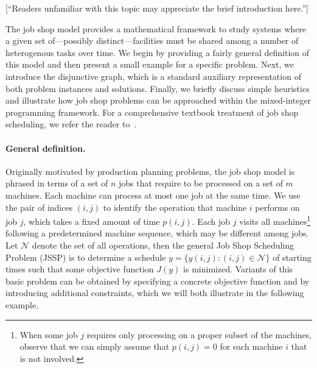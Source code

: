 \documentclass[a4paper]{report}
\theoremstyle{definition}
\theoremstyle{plain}
\newcommand\note[1]{{\color{Navy}#1}}
\begin{document}
\note{[``Readers unfamiliar with this topic may appreciate the brief introduction here.'']}

The job shop model provides a mathematical framework to study systems where a
given set of---possibly distinct---facilities must be shared among a number of
heterogenous tasks over time.
%
We begin by providing a fairly general definition of this model and then present a
small example for a specific problem.
%
Next, we introduce the disjunctive graph, which is a standard auxiliary
representation of both problem instances and solutions.
%
Finally, we briefly discuss simple heuristics and illustrate how job shop
problems can be approached within the mixed-integer programming framework.
%
For a comprehensive textbook treatment of job shop scheduling, we refer the
reader to~\cite[Chapter 7]{pinedoSchedulingTheoryAlgorithms2016}.

\paragraph{General definition.}
Originally motivated by production planning problems, the job shop model is
phrased in terms of a set of $n$ jobs that require to be processed on a set of
$m$ machines. Each machine can process at most one job at the same time.
%
We use the pair of indices $(i,j)$ to identify the operation that machine $i$
performs on job $j$, which takes a fixed amount of time $p(i,j)$.
%
Each job $j$ visits all machines\footnote{When some job $j$ requires only
  processing on a proper subset of the machines, observe that we can simply
  assume that $p(i,j) = 0$ for each machine $i$ that is not involved.} following
a predetermined machine sequence, which may be different among jobs.
%
Let $\mathcal{N}$ denote the set of all operations, then the general Job Shop Scheduling
Problem (JSSP) is to determine a schedule $y = \{ y(i,j) : (i,j) \in \mathcal{N} \}$ of
starting times such that some objective function $J(y)$ is minimized.
%
Variants of this basic problem can be obtained by specifying a concrete
objective function and by introducing additional constraints, which we will both
illustrate in the following example.
\end{document}
